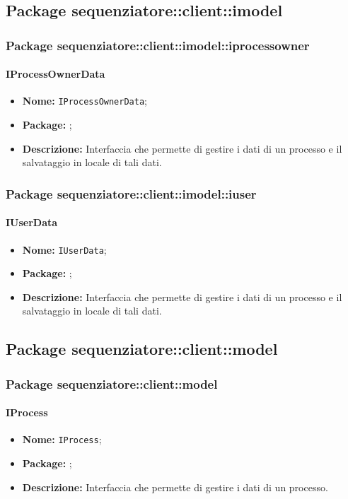 \subsection{Package sequenziatore::client::imodel}

\subsubsection{Package sequenziatore::client::imodel::iprocessowner}
\paragraph{IProcessOwnerData}
\begin{itemize}
\item \textbf{Nome:} \texttt{IProcessOwnerData};
\item \textbf{Package:} \texttt{\iModelAdmin{}};
\item \textbf{Descrizione:} Interfaccia che permette di gestire i dati di un processo e il salvataggio in locale di tali dati.
\end{itemize}

\subsubsection{Package sequenziatore::client::imodel::iuser}
\paragraph{IUserData}
\begin{itemize}
\item \textbf{Nome:} \texttt{IUserData};
\item \textbf{Package:} \texttt{\iModelUser{}};
\item \textbf{Descrizione:} Interfaccia che permette di gestire i dati di un processo e il salvataggio in locale di tali dati.
\end{itemize}

\subsection{Package sequenziatore::client::model}
\subsubsection{Package sequenziatore::client::model}
\paragraph{IProcess}
\begin{itemize}
\item \textbf{Nome:} \texttt{IProcess};
\item \textbf{Package:} \texttt{\model{}};
\item \textbf{Descrizione:} Interfaccia che permette di gestire i dati di un processo.
\end{itemize}

